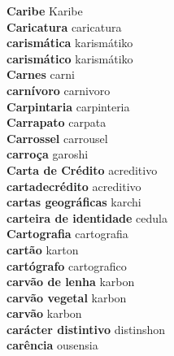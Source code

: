 \textbf{ Caribe  } Karibe \\
\textbf{ Caricatura  } caricatura \\
\textbf{ carismática  } karismátiko \\
\textbf{ carismático  } karismátiko \\
\textbf{ Carnes  } carni \\
\textbf{ carnívoro  } carnivoro \\
\textbf{ Carpintaria  } carpinteria \\
\textbf{ Carrapato  } carpata \\
\textbf{ Carrossel  } carrousel \\
\textbf{ carroça  } garoshi \\
\textbf{ Carta de Crédito  } acreditivo \\
\textbf{ cartadecrédito  } acreditivo \\
\textbf{ cartas geográficas  } karchi \\
\textbf{ carteira de identidade  } cedula \\
\textbf{ Cartografia  } cartografia \\
\textbf{ cartão  } karton \\
\textbf{ cartógrafo  } cartografico \\
\textbf{ carvão de lenha  } karbon \\
\textbf{ carvão vegetal  } karbon \\
\textbf{ carvão  } karbon \\
\textbf{ carácter distintivo  } distinshon \\
\textbf{ carência  } ousensia \\
